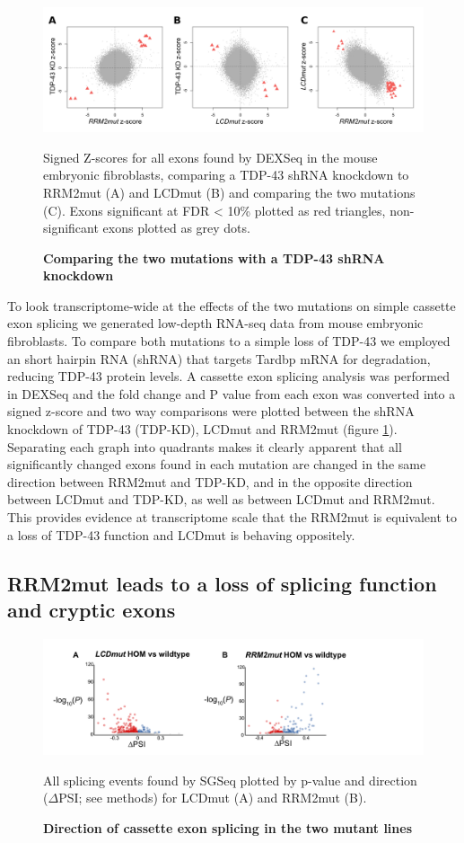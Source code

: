\begin{figure}[h!]
	\centering
	\includegraphics[width=14cm]{Figures/05_tdp_mice/mef_scatters.png}
	\caption{\textbf{Comparing the two mutations with a TDP-43 shRNA knockdown}}
	Signed Z-scores for all exons found by DEXSeq in the mouse embryonic fibroblasts, comparing a TDP-43 shRNA knockdown to RRM2mut (A) and LCDmut (B) and comparing the two mutations (C). Exons significant at FDR < 10\% plotted as red triangles, non-significant exons plotted as grey dots.
	\label{fig:mef_scatters}
\end{figure}

To look transcriptome-wide at the effects of the two mutations on simple cassette exon splicing we generated low-depth RNA-seq data from mouse embryonic fibroblasts. To compare both mutations to a simple loss of TDP-43 we employed an short hairpin RNA (shRNA) that targets Tardbp mRNA for degradation, reducing TDP-43 protein levels. A cassette exon splicing analysis was performed in DEXSeq and the fold change and P value from each exon was converted into a signed z-score and two way comparisons were plotted between the shRNA knockdown of TDP-43 (TDP-KD), LCDmut and RRM2mut (figure \ref{fig:mef_scatters}). Separating each graph into quadrants makes it clearly apparent that all significantly changed exons found in each mutation are changed in the same direction between RRM2mut and TDP-KD, and in the opposite direction between LCDmut and TDP-KD, as well as between LCDmut and RRM2mut. This provides evidence at transcriptome scale that the RRM2mut is equivalent to a loss of TDP-43 function and LCDmut is behaving oppositely.

\subsection{RRM2mut leads to a loss of splicing function and cryptic exons}

\begin{figure}[h!]
	\centering
	\includegraphics[width=15cm]{Figures/05_tdp_mice/transcriptome_scatters.png}
	\caption{\textbf{Direction of cassette exon splicing in the two mutant lines}}
	All splicing events found by SGSeq plotted by p-value and direction ($\Delta$PSI; see methods) for LCDmut (A) and RRM2mut (B).
	\label{fig:cassette_scatters}
\end{figure}

